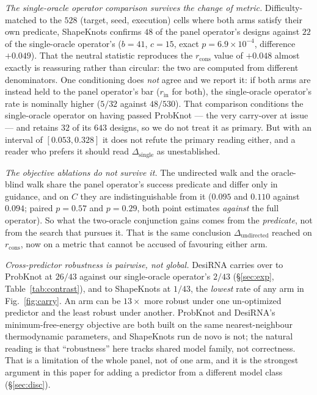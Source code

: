 \documentclass[11pt]{article}
\begin{document}
\emph{The single-oracle operator comparison survives the change of metric.} Difficulty-matched to the $528$ (target, seed,
execution) cells where both arms satisfy their own predicate, ShapeKnots confirms $48$ of the panel operator's
designs against $22$ of the single-oracle operator's ($b{=}41$, $c{=}15$, exact $p{=}6.9\!\times\!10^{-4}$, difference
${+}0.049$). That the neutral statistic reproduces the $r_{\mathrm{cons}}$ value of ${+}0.048$ almost exactly is
reassuring rather than circular: the two are computed from different denominators. One conditioning does
\emph{not} agree and we report it: if both arms are instead held to the panel operator's bar
($r_{\mathrm{in}}$ for both), the single-oracle operator's rate is nominally higher ($5/32$ against $48/530$). That comparison conditions the single-oracle operator on having passed ProbKnot --- the very carry-over at issue
--- and retains $32$ of its $643$ designs, so we do not treat it as primary. But with an interval of
$[0.053,0.328]$ it does not refute the primary reading either, and a reader who prefers it should read
$\Delta_{\mathrm{single}}$ as unestablished.

\emph{The objective ablations do not survive it.} The undirected walk and the oracle-blind walk share the panel
operator's success predicate and differ only in guidance, and on $C$ they are indistinguishable from it
($0.095$ and $0.110$ against $0.094$; paired $p{=}0.57$ and $p{=}0.29$, both point estimates \emph{against}
the full operator). So what the two-oracle conjunction gains comes from the \emph{predicate}, not from the search that pursues it. That is the same conclusion $\Delta_{\mathrm{undirected}}$ reached on
$r_{\mathrm{cons}}$, now on a metric that cannot be accused of favouring either arm.

\emph{Cross-predictor robustness is pairwise, not global.} DesiRNA carries over to ProbKnot at $26/43$ against
our single-oracle operator's $2/43$ (\S\ref{sec:exp}, Table~\ref{tab:contrast}), and to ShapeKnots at $1/43$, the
\emph{lowest} rate of any arm in Fig.~\ref{fig:carry}. An arm can be $13\times$ more robust under one
un-optimized predictor and the least robust under another. ProbKnot and DesiRNA's minimum-free-energy
objective are both built on the same nearest-neighbour thermodynamic parameters, and ShapeKnots run de novo is
not; the natural reading is that ``robustness'' here tracks shared model family, not correctness. That is a limitation of the whole panel, not of one arm, and it is the strongest argument in this
paper for adding a predictor from a different model class (\S\ref{sec:disc}).
\end{document}
